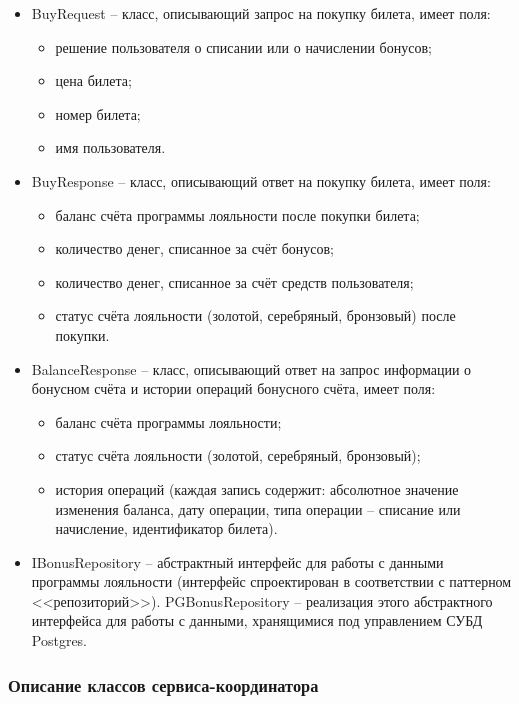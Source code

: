 \begin{itemize}
    \item BuyRequest -- класс, описывающий запрос на покупку билета, имеет поля:
    \begin{itemize}
        \item решение пользователя о списании или о начислении бонусов;
        \item цена билета;
        \item номер билета;
        \item имя пользователя.
    \end{itemize}
    \item BuyResponse -- класс, описывающий ответ на покупку билета, имеет поля:
    \begin{itemize}
        \item баланс счёта программы лояльности после покупки билета;
        \item количество денег, списанное за счёт бонусов;
        \item количество денег, списанное за счёт средств пользователя;
        \item статус счёта лояльности (золотой, серебряный, бронзовый) после покупки.
    \end{itemize}
    \item BalanceResponse -- класс, описывающий ответ на запрос информации о бонусном счёта и истории операций бонусного счёта, имеет поля:
    \begin{itemize}
        \item баланс счёта программы лояльности;
        \item статус счёта лояльности (золотой, серебряный, бронзовый);
        \item история операций (каждая запись содержит: абсолютное значение изменения баланса, дату операции, типа операции -- списание или начисление, идентификатор билета).
    \end{itemize}
    \item IBonusRepository -- абстрактный интерфейс для работы с данными программы лояльности (интерфейс спроектирован в соответствии с паттерном <<репозиторий>>). PGBonusRepository -- реализация этого абстрактного интерфейса для работы с данными, хранящимися под управлением СУБД Postgres.
\end{itemize}

\subsubsection{Описание классов сервиса-координатора}

